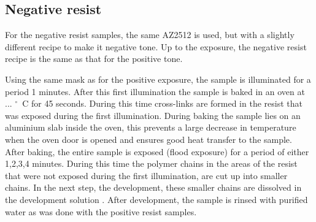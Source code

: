 \subsection*{Negative resist}
For the negative resist samples, the same AZ2512 is used, but with a slightly different recipe to make it negative tone. Up to the exposure, the negative resist recipe is the same as that for the positive tone. 

Using the same mask as for the positive exposure, the sample is illuminated for a period 1  minutes. After this first illumination the sample is baked in an oven at ...  $^\circ$~C for 45 seconds. During this time cross-links are formed in the resist that was exposed during the first illumination. During baking the sample lies on an aluminium slab inside the oven, this prevents a large decrease in temperature when the oven door is opened and ensures good heat transfer to the sample. After baking, the entire sample is exposed (flood exposure) for a period of either 1,2,3,4  minutes. During this time the polymer chains in the areas of the resist that were not exposed during the first illumination, are cut up into smaller chains. In the next step, the development, these smaller chains are dissolved in the development solution . After development, the sample is rinsed with purified water as was done with the positive resist samples.